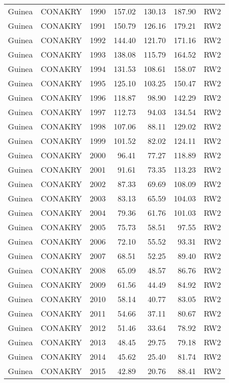 \begin{longtable}{lllrrrl}
  Guinea & CONAKRY & 1990 & 157.02 & 130.13 & 187.90 & RW2 \\ 
  Guinea & CONAKRY & 1991 & 150.79 & 126.16 & 179.21 & RW2 \\ 
  Guinea & CONAKRY & 1992 & 144.40 & 121.70 & 171.16 & RW2 \\ 
  Guinea & CONAKRY & 1993 & 138.08 & 115.79 & 164.52 & RW2 \\ 
  Guinea & CONAKRY & 1994 & 131.53 & 108.61 & 158.07 & RW2 \\ 
  Guinea & CONAKRY & 1995 & 125.10 & 103.25 & 150.47 & RW2 \\ 
  Guinea & CONAKRY & 1996 & 118.87 & 98.90 & 142.29 & RW2 \\ 
  Guinea & CONAKRY & 1997 & 112.73 & 94.03 & 134.54 & RW2 \\ 
  Guinea & CONAKRY & 1998 & 107.06 & 88.11 & 129.02 & RW2 \\ 
  Guinea & CONAKRY & 1999 & 101.52 & 82.02 & 124.11 & RW2 \\ 
  Guinea & CONAKRY & 2000 & 96.41 & 77.27 & 118.89 & RW2 \\ 
  Guinea & CONAKRY & 2001 & 91.61 & 73.35 & 113.23 & RW2 \\ 
  Guinea & CONAKRY & 2002 & 87.33 & 69.69 & 108.09 & RW2 \\ 
  Guinea & CONAKRY & 2003 & 83.13 & 65.59 & 104.03 & RW2 \\ 
  Guinea & CONAKRY & 2004 & 79.36 & 61.76 & 101.03 & RW2 \\ 
  Guinea & CONAKRY & 2005 & 75.73 & 58.51 & 97.55 & RW2 \\ 
  Guinea & CONAKRY & 2006 & 72.10 & 55.52 & 93.31 & RW2 \\ 
  Guinea & CONAKRY & 2007 & 68.51 & 52.25 & 89.40 & RW2 \\ 
  Guinea & CONAKRY & 2008 & 65.09 & 48.57 & 86.76 & RW2 \\ 
  Guinea & CONAKRY & 2009 & 61.56 & 44.49 & 84.92 & RW2 \\ 
  Guinea & CONAKRY & 2010 & 58.14 & 40.77 & 83.05 & RW2 \\ 
  Guinea & CONAKRY & 2011 & 54.66 & 37.11 & 80.67 & RW2 \\ 
  Guinea & CONAKRY & 2012 & 51.46 & 33.64 & 78.92 & RW2 \\ 
  Guinea & CONAKRY & 2013 & 48.45 & 29.75 & 79.18 & RW2 \\ 
  Guinea & CONAKRY & 2014 & 45.62 & 25.40 & 81.74 & RW2 \\ 
  Guinea & CONAKRY & 2015 & 42.89 & 20.76 & 88.41 & RW2 \\ 

\end{longtable}
